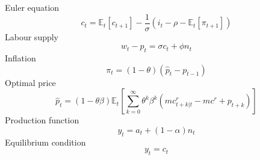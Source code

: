 \documentclass[12pt,a4paper,english]{article} %
\newcommand{\E}{\mathbb{E}} %
\begin{document}
	Euler equation
	\begin{equation} \label{eq:lleuler}
		c_t = \E_t[c_{t+1}] - \frac{1}{\sigma} (i_t - \rho - \E_t [\pi_{t+1}])
	\end{equation}
	Labour supply 
	\begin{equation} \label{eq:llslabour}
		w_t - p_t = \sigma c_t + \phi n_t
	\end{equation}
	Inflation
	\begin{equation}\label{eq:llpi}
		\pi_t = (1 - \theta) (\hat{p}_t - p_{t-1})	
	\end{equation}
	Optimal price 
	\begin{equation}\label{eq:llpstar}
		\hat{p}_t = (1 - \theta \beta) \E_t
		\left[
		\sum_{k=0}^{\infty} \theta^k \beta^k \left( mc_{t+k|t}^r - mc^r +p_{t+k}\right)
		\right]		
	\end{equation}
	Production function
	\begin{equation}\label{eq:llprod}
		y_t = a_t + (1 - \alpha) n_t
	\end{equation}
	Equilibrium condition 
	\begin{equation}\label{eq:lleq}
		y_t = c_t
	\end{equation}
\end{document}
